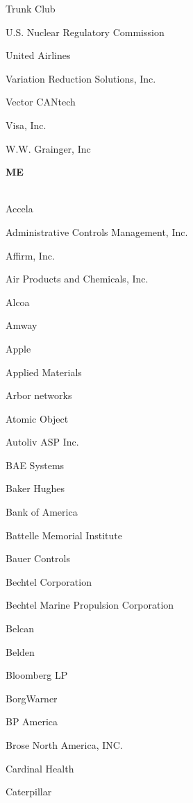 \documentclass[twoside]{article}
\begin{document}
\begin{center}
\begin{multicols}{5}
\begin{FlushLeft}
\begin{compactitem}
\item Trunk Club
\item U.S. Nuclear Regulatory Commission
\item United Airlines
\item Variation Reduction Solutions, Inc.
\item Vector CANtech
\item Visa, Inc.
\item W.W. Grainger, Inc
\end{compactitem}
        \end{FlushLeft}
        \vspace{1em}
        {\fontsize{14}{16}\selectfont \bf ME}\\
        \vspace{-1em}
        ~\hrulefill~
        \vspace{-.9em}
        \begin{FlushLeft}
        \begin{compactitem}
        \item Accela
\item Administrative Controls Management, Inc.
\item Affirm, Inc.
\item Air Products and Chemicals, Inc.
\item Alcoa
\item Amway
\item Apple
\item Applied Materials
\item Arbor networks
\item Atomic Object
\item Autoliv ASP Inc.
\item BAE Systems
\item Baker Hughes
\item Bank of America
\item Battelle Memorial Institute
\item Bauer Controls
\item Bechtel Corporation
\item Bechtel Marine Propulsion Corporation
\item Belcan
\item Belden
\item Bloomberg LP
\item BorgWarner
\item BP America
\item Brose North America, INC.
\item Cardinal Health
\item Caterpillar

\end{compactitem}
\end{FlushLeft}
\end{multicols}
\end{center}
\end{document}
